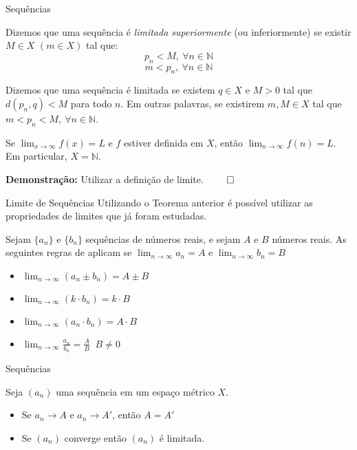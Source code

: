 \documentclass[hyperref={pdfpagelabels=false}]{beamer}
\begin{document}
\begin{frame}{Sequências}
 \begin{definition}
  Dizemos que uma sequência é \emph{limitada superiormente} (ou inferiormente) se existir $M \in X$ $(m \in X)$ tal que:
  $$p_n < M,~\forall n \in \mathbb{N}$$
  $$m < p_n ,~\forall n \in \mathbb{N}$$
  
  Dizemos que uma sequência é limitada se existem $q \in X$ e $M > 0$ tal que $d(p_n,q)<M$ para todo $n$. Em outras palavras, se existirem $m,M \in X$ tal que $m<p_n<M,~\forall n \in \mathbb{N}$.
 \end{definition} \pause
 
 \begin{theorem}
  Se $\displaystyle \lim_{x \to \infty}f(x) = L$ e $f$ estiver definida em $X$, então $\displaystyle \lim_{n \to \infty}f(n) = L$. Em particular, $X = \mathbb{N}$.
 \end{theorem} \pause
 
 
  {\bf Demonstração:} Utilizar a definição de limite. $\qed$
 

\end{frame}

\begin{frame}{Limite de Sequências}
 Utilizando o Teorema anterior é possível utilizar as propriedades de limites que já foram estudadas. \pause
 
 \begin{theorem}
  Sejam $\{a_n\}$ e $\{b_n\}$ sequências de números reais, e sejam $A$ e $B$ números reais. As seguintes regras de aplicam se $\displaystyle \lim_{n \to \infty} a_n = A$ e $\displaystyle \lim_{n \to \infty} b_n = B$
  \begin{itemize}
  \item $\displaystyle \lim_{n \to \infty} (a_n \pm b_n) = A \pm B$ \pause
  \item $\displaystyle \lim_{n \to \infty} (k \cdot b_n) = k\cdot B~$  \pause
  \item $\displaystyle \lim_{n \to \infty} (a_n \cdot b_n) = A \cdot B$ \pause
  \item $\displaystyle \lim_{n \to \infty} \frac{a_n}{b_n} = \frac{A}{B} ~$  $B \neq 0$
 \end{itemize}
 \end{theorem}

\end{frame}

\begin{frame}{Sequências}
\begin{theorem}
 Seja $(a_n)$ uma sequência em um espaço métrico $X$.
 \begin{itemize}
  \item Se $a_n \to A$ e $a_n \to A'$, então $A = A'$  \pause
  \item Se $(a_n)$ converge então $(a_n)$ é limitada. 
 \end{itemize}

\end{theorem}
 
\end{frame}
\end{document}
